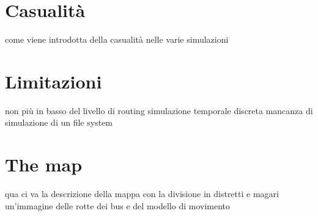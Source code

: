 \section{Casualità}
come viene introdotta della casualità nelle varie simulazioni

\section{Limitazioni}
\label{limitazioniONE}
non più in basso del livello di routing
simulazione temporale discreta
mancanza di simulazione di un file system

\section{The map}
\label{mappaONE}
qua ci va la descrizione della mappa con la divisione in distretti e magari un'immagine delle rotte dei bus e del modello di movimento


